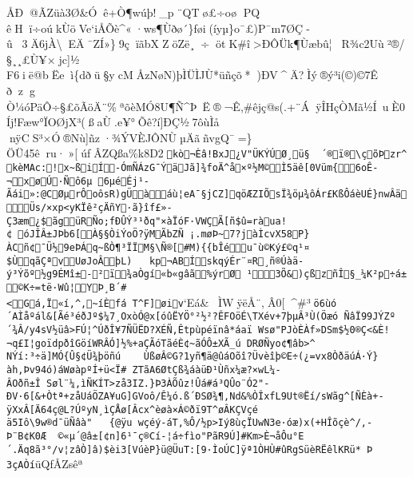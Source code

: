 \documentclass[
]{article}
\begin{document}
{ÅÐ@ÃZüà3Ø\&Óê+Ò¶wúþ!\_p¨QTø£÷oø
PQ
êHï÷oúkÙöVe`iÅÕè\^{}«·ws¶Ùðø´\}føi(íyµ\}o¯£)P¯m7ØÇ­û3Ä6jÀ\textbackslash\textbarEÄ¯ZÍ»\}9çïãbXZöZë¸÷ötK\#î\textgreater ÐÔÜk¶Ùæbû¦R¾c2Uù²®/
§¸¸£Ù¥×j­c{]}½
F6ië@bËeì\{dðü§ycMÅzNøN)þÌÜÌJÙ*\textquotesingle üñçõ*)ÐV\^{}Ä?Ìý®ý³i(©)©7Ê  ðz\textquotesinglegÒ ¼óPäÔ÷§£õÃöÄ¨\%ªõèMÓ8U¶Ñ\^{}Þ~Ë®¬Ê,\#êjç@s(.+¨ÁÿÎHçÒMã½Í~uÈ0Íj!Fæw°ÏOØjX³(ßaÙ.e¥°Õê?í{]}ÐÇ½7ôùÌå
nÿCS³×Ó®Nù{]}ñz·¾ÝVÈJÔNÙµÄãñvgQ¯=\}ÖÜ45êru·»{[}úfÂZQßa\%k8D2\texttt{kò¬Èâ!\textbar{}BxJ¿V"ÜKÝÚØ¸ü§\ \ ´®ï®\textbackslash{}çõÞzr\^{}kèM­Ac:!x\textasciitilde{}ßiÍ-ÓmÑÁzG¯ÝäJã{]}¾foÄ\^{}å×º½M©Ì5äê{[}0V\textquotesingle{}üm\{6oÊ­¬x\textquotesingle{}øÚ·Ñô6µ\ 6µéÉj¹­Ãái»:@CØµrÔoôsR)gÜàáù¦eA¯§jCZ{]}qöÆZIÕsÏ¾öµ¾ôÁr£Kß\textbar{}ÔáèUÉ\}nwÂäÜs/×xp\textless{}yKÏê²çÄñY·ã\}îf£»­Ç3æm¿\$ãgüRÑo;fÐÛÝ³¹ðq"×àÏóF·VWÇÃ{[}ñ\$û=ràua!¢\ óJÎÂ±JÞb6{[} À§§ÒiÝoÖ?ÿMÃbZÑ~¡.møÞ\textasciitilde{}7?jàÌcvX58P\}ÀCñ¢¯Ü½9eÞÁq\textasciitilde{}ßÒ¶³ÏÏM§\textbackslash{}Ñ®{[}\#M)\{\{bÎéu¯ù©Ký£©q¹¤\$ÙqãÇªvUøJoÂþL\textbar{})\ \ \ kp¬ABÍskqýÉr¨¤R¸ñ®Úàä­ý³Ýõº½g9ÉMî±-²ï¾aÒgí«b«gâã\%ýrØ\ ¹3Õ\&)çß zñÎ§\_¼K²p÷á±©K÷=të·Wû¦YÞ¸B´\#\textless{}Gá\textasciigrave{}\textasciigrave{},Ï«í,\^{},\textasciitilde{}íÈfá~T\^{}F{]}øiv}`Eá\&ÌWÿëÅ¨,Â0{[}\^{}\#³\texttt{ö6ùó´AÌåºál\&{[}Ãé³éðJº\$¼7\textbar{}¸OxòÓ@x{[}óûËYÖ°²½²?ÊFOöÉ\textbackslash{}TXév+7þµÂ³Ù(Öæó~ÑâÏ99JÝZº´¾Â/y4sV½ü­â\textgreater{}FÚ¦\^{}ÚðÎ¥7ÑÜËD?XÉÑ, Êtpùpéïnâ*áaï\ Wsø"PJòÈÀf»DSm\$\textquotesingle{}½0®Ç\textless{}\&È!¬q£I¦­goïdpðîGöíWRÂÓ{]}½\%+aÇÃóTãéÈ¢\textasciitilde{}ãÓÔ±X\textquotesingle{}Ã\_ú\ DRØÑyo¢¶âb\textgreater{}\^{}NÝí:³÷ä{]}MÓ\{Û§¢Ü¾þöñú\ \ \ \ ÙßøÂ©G?1yñ¶ä@ûáOõî?Üvèîþ©E÷(¿=vx8ÒðäúÁ\textquotesingle{}·Ý\}àh,Þv94\textbar{}ó)áWøàpºÍ+ü\textless{}Ï\#\ ZTãA6ØtÇß¾áàüÐ¹Ùñx¼æ?×wL\textquotesingle{}¼-ÂOðñ±Î~Søl¨¼,ìÑKÍT\textgreater{}zå3IZ.\}Þ3ÀÕûz!Ûá\#á³QÛo¨Ó2"­ÐV·6{[}\&+Òtª+zåUáÖZA¥uG{]}GVoô/Ê¼­ó.ß´ÐSØ¾¶,Nd\&\%ÒÎxfL9Ut®Ëí/sWãg\^{}{[}ÑÈà+­ÿXxÂ{[}Ä64ç@L?ÚºyN¸ìÇÅø{[}Âcx\^{}è øà×Á©ðï9T\^{}øÂKÇVçéä5Iô\textbackslash{}9w®d¯üÑâà"\ \ \ \{@ÿu~wçéý-áT,\%Ô/½p\textgreater{}Iý8ùçÏUwN3e·óæ)x\textquotesingle{}(+HÎõçè\^{}/,­Þ¨B¢K0Æ\ \ ©«µ´@â±{[}¢n{]}6¹¯ç®Cí-¦á÷fìo"PãR9Ú{]}\#Km\textgreater{}È¬åÔu°­E´.Äq8ã³°/v¦zâÒ{]}â)\$èi3{[}VúèP\}ü@ÜuT:{[}9·ÌoÚC{]}ÿª1ÒHÙ\#ûRgSüèRËêlKRü*\ ­Þ3çAÒí}üQfÅZsêª
}
\end{document}
